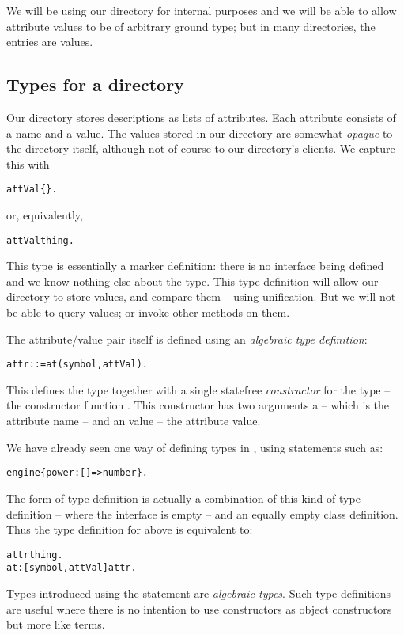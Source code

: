 We will be using our directory for internal purposes and we will be able to allow attribute values to be of arbitrary ground type; but in many directories, the entries are  values.

\subsection{Types for a directory}
\label{directory:types}
Our directory stores descriptions as lists of attributes. Each attribute consists of a name and a value. The values stored in our directory are somewhat \emph{opaque} to the directory itself, although not of course to our directory's clients. We capture this with 
\begin{alltt}
attVal \typearrow \{\}.
\end{alltt}
or, equivalently,
\begin{alltt}
attVal \typearrow thing.
\end{alltt}
This type is essentially a marker definition: there is no interface being defined and we know nothing else about the  type. This type definition will allow our directory to store values, and compare them -- using unification. But we will not be able to query  values; or invoke other methods on them.

The attribute/value pair itself is defined using an \emph{algebraic type definition}:
\begin{alltt}
attr ::= at(symbol,attVal).
\end{alltt}
This defines the  type together with a single statefree \emph{constructor} for the type -- the constructor function . This constructor has two arguments a  -- which is the attribute name -- and an  value -- the attribute value.

We have already seen one way of defining types in \go, using statements such as:
\begin{alltt}
engine \typearrow \{ power:[]=>number \}.
\end{alltt}
The \q{::=} form of type definition is actually a combination of this kind of type definition -- where the interface is empty -- and an equally empty class definition. Thus the type definition for  above is equivalent to:
\begin{alltt}
attr \typearrow thing.
at:[symbol,attVal]\conarrow{}attr.
\end{alltt}
Types introduced using the \q{::=} statement are \emph{algebraic types}. Such type definitions are useful where there is no intention to use constructors as object constructors but more like \prolog terms.

